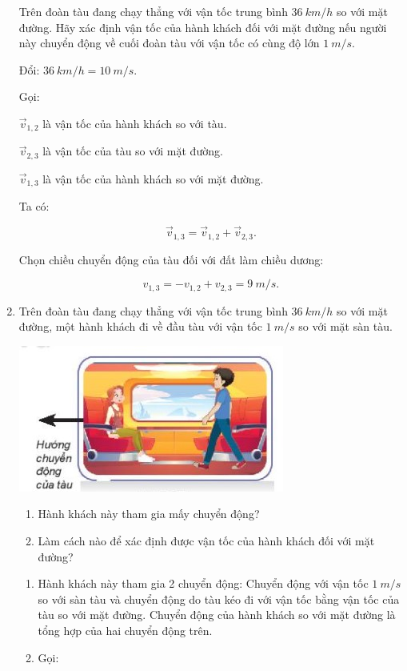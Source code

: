 \begin{enumerate}[label=\bfseries Bài \arabic*:]
	
	{   
		Trên đoàn tàu đang chạy thẳng với vận tốc trung bình $\SI{36}{km/h}$ so với mặt đường. Hãy xác định vận tốc của hành khách đối với mặt đường nếu người này chuyển động về cuối đoàn tàu với vận tốc có cùng độ lớn $\SI{1}{m/s}$.
	}
	\hideall
	{
		
		Đổi: $\SI{36}{km/h} = \SI{10}{m/s}$.
		
		Gọi:
		
		$\vec v_{1,2}$ là vận tốc của hành khách so với tàu.
		
		$\vec v_{2,3}$ là vận tốc của tàu so với mặt đường.
		
		$\vec v_{1,3}$ là vận tốc của hành khách so với mặt đường.
		
		Ta có:
		
		$$\vec v_{1,3} = \vec v_{1,2} + \vec v_{2,3}.$$
		
		Chọn chiều chuyển động của tàu đối với đất làm chiều dương:
		
		$$v_{1,3} = - v_{1,2} + v_{2,3} = \SI{9}{m/s}.$$
		
		
	}

	\item {}
	
	
	{
		Trên đoàn tàu đang chạy thẳng với vận tốc trung bình $\SI{36}{km/h}$ so với mặt đường, một hành khách đi về đầu tàu với vận tốc $\SI{1}{m/s}$ so với mặt sàn tàu.
		\begin{center}
			\includegraphics[scale=1]{../figs/VN10-2022-PH-TP005-3.jpg}
		\end{center}
		\begin{enumerate}[label=\alph*)]
			\item Hành khách này tham gia mấy chuyển động?
			\item Làm cách nào để xác định được vận tốc của hành khách đối với mặt đường?
		\end{enumerate}
	}
	\hideall
	{
		\begin{enumerate}[label=\alph*)]
			\item Hành khách này tham gia 2 chuyển động: Chuyển động với vận tốc $\SI{1}{m/s}$ so với sàn tàu và chuyển động do tàu kéo đi với vận tốc bằng vận tốc của tàu so với mặt đường. Chuyển động của hành khách so với mặt đường là tổng hợp của hai chuyển động trên.
			\item Gọi:
			

\end{enumerate}}
\end{enumerate}
